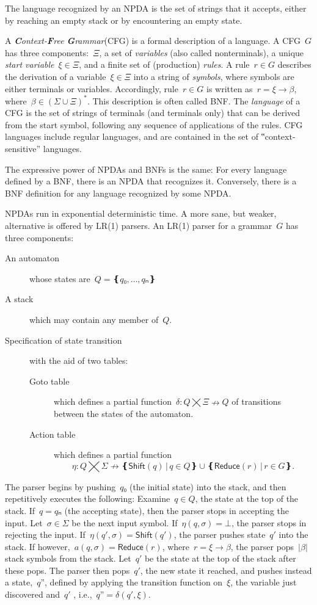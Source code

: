 The language recognized by an NPDA is the set of strings that it accepts,
  either by reaching an empty stack or by encountering an empty state.

A \emph{\textbf Context-\textbf Free \textbf Grammar}(CFG) is a formal description of a language.
A CFG~$G$ has three components:~$Ξ$,
a set of \emph{variables} (also called nonterminals), a unique \emph{start variable}~$ξ∈Ξ$, and
  a finite set of (production) \emph{rules}.
A rule~$r∈G$ describes the derivation of a variable~$ξ∈Ξ$ into
  a string of \emph{symbols}, where symbols are either terminals or variables.
Accordingly, rule~$r∈G$ is written as~$r=ξ→β$, where~$β∈\left(Σ∪Ξ\right)^*$.
This description is often called BNF.
The \emph{language} of a CFG is the set of strings of terminals (and terminals only)
  that can be derived from the start symbol, following any sequence of applications of the rules.
CFG languages include regular languages, and are contained in the set
  of ‟context-sensitive” languages.

The expressive power of NPDAs and BNFs is the same:
  For every language defined by a BNF, there is an NPDA that recognizes it.
Conversely, there is a BNF definition for any language recognized by some NPDA.

NPDAs run in exponential deterministic time.
A more sane, but weaker, alternative is offered by LR(1) parsers.
An LR(1) parser for a grammar~$G$ has three components:
\begin{description}
  \item[An automaton] whose states are~$Q=❴q₀,…,qₙ❵$
  \item[A stack] which may contain any member of~$Q$.
  \item[Specification of state transition] with the aid of two tables:
        \begin{description}
          \item[Goto table] which defines a partial function~$δ:Q⨉Ξ↛Q$ of transitions
          between the states of the automaton.
          \item[Action table] which
            defines a partial function\[η:Q⨉Σ↛ ❴ \textsf{Shift}(q) \,|\, q∈Q❵ ∪ ❴\textsf{Reduce}(r) \,| \, r∈G❵.\]
        \end{description}
\end{description}
The parser begins by pushing~$q₀$ (the initial state) into the stack,
and then repetitively executes the following:
Examine~$q∈Q$, the state at the top of the stack.
If~$q=qₙ$ (the accepting state), then the parser stops in accepting the input.
Let~$σ∈Σ$ be the next input symbol.
If~$η(q,σ)=⊥$, the parser stops in rejecting the input.
If~$η(q',σ) = \textsf{Shift}(q')$, the parser pushes state~$q'$ into the stack.
If however,~$a(q,σ) = \textsf{Reduce}(r)$,
where~$r=ξ→β$,
the parser pops~$|β|$ stack symbols from the stack.
Let~$q'$ be the state at the top of the stack after these pops.
The parser then pops~$q'$, the new state it reached,
  and pushes instead a state,~$q”$,
  defined by applying the transition function on~$ξ$, the variable just discovered and~$q'$ , i.e.,~$q”=δ(q',ξ)$.

